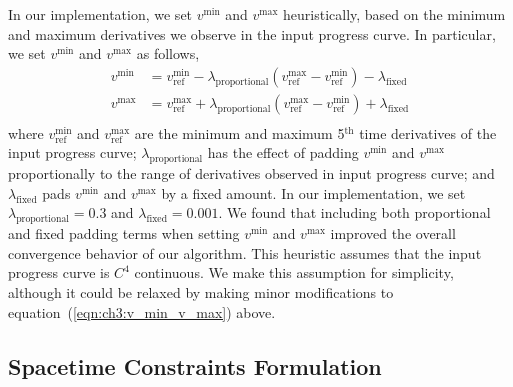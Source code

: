 In our implementation, we set $v^{\text{min}}$ and $v^{\text{max}}$ heuristically, based on the minimum and maximum derivatives we observe in the input progress curve.
In particular, we set $v^{\text{min}}$ and $v^{\text{max}}$ as follows,
%
\begin{equation}
\begin{aligned}
%
v^{\text{min}} & = v^{\text{min}}_{\text{ref}} - \lambda_{\text{proportional}} ( v^{\text{max}}_{\text{ref}} - v^{\text{min}}_{\text{ref}} ) - \lambda_{\text{fixed}} \\
v^{\text{max}} & = v^{\text{max}}_{\text{ref}} + \lambda_{\text{proportional}} ( v^{\text{max}}_{\text{ref}} - v^{\text{min}}_{\text{ref}} ) + \lambda_{\text{fixed}} \\
%
\end{aligned}
\label{eqn:ch3:v_min_v_max}
\end{equation}
%
where $v^{\text{min}}_{\text{ref}}$ and $v^{\text{max}}_{\text{ref}}$ are the minimum and maximum 5$^\text{th}$ time derivatives of the input progress curve;
$\lambda_{\text{proportional}}$ has the effect of padding $v^{\text{min}}$ and $v^{\text{max}}$ proportionally to the range of derivatives observed in input progress curve;
and $\lambda_{\text{fixed}}$ pads $v^{\text{min}}$ and $v^{\text{max}}$ by a fixed amount.
In our implementation, we set $\lambda_{\text{proportional}} = 0.3$ and $\lambda_{\text{fixed}} = 0.001$.
We found that including both proportional and fixed padding terms when setting $v^{\text{min}}$ and $v^{\text{max}}$ improved the overall convergence behavior of our algorithm.
This heuristic assumes that the input progress curve is $C^4$ continuous.
We make this assumption for simplicity, although it could be relaxed by making minor modifications to equation~(\ref{eqn:ch3:v_min_v_max}) above.

\subsection{Spacetime Constraints Formulation}
\label{sec:ch3:spacetime}

